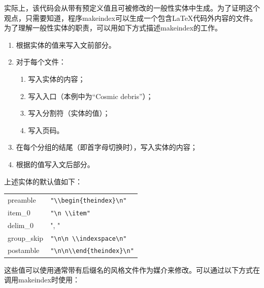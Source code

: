 实际上，该代码会从带有预定义值且可被修改的一般性实体中生成。为了证明这个观点，只需要知道，程序\textsf{makeindex}可以生成一个包含\LaTeX 代码外内容的文件。为了理解一般性实体的职责，可以用如下方式描述\textsf{makeindex}的工作。

\begin{enumerate}
    \item 根据实体的值来写入文前部分。
    \item 对于每个文件：
    \begin{enumerate}
        \item 写入实体的内容；
        \item 写入入口（本例中为``Cosmic debris''）；
        \item 写入分割符（实体的值）；
        \item 写入页码。
    \end{enumerate}
    \item 在每个分组的结尾（即首字母切换时），写入实体的内容；
    \item 根据的值写入文后部分。
\end{enumerate}

上述实体的默认值如下：

\begin{center}
    \begin{dmd}
        \begin{tabular}{|l|l|}
            \hline
            preamble & \verb+"\\begin{theindex}\n"+\\
            item\_0 &\verb+"\n \\item"+\\
            delim\_0 & ", "\\
            group\_skip & \verb+"\n\n \\indexspace\n"+\\
            postamble & \verb+"\n\n\\end{theindex}\n"+\\
            \hline
        \end{tabular}
    \end{dmd}
\end{center}

这些值可以使用通常带有后缀名的风格文件作为媒介来修改。可以通过以下方式在调用\textsf{makeindex}时使用：


